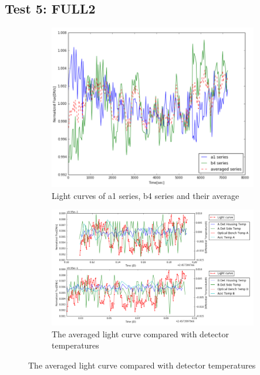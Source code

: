 \documentclass{aastex6}
\begin{document}
\subsection{Test 5: FULL2} 
\begin{figure}[H]
    \centering
    \begin{subfigure}{1}
        \includegraphics[scale=0.4]{ts_test5}
        \caption{Light curves of a1 series, b4 series and their average}
    \end{subfigure}

    \begin{subfigure}{2}
        \includegraphics[scale=0.4]{temp_test5}
        \caption{The averaged light curve compared with detector temperatures}
    \end{subfigure}
   

\end{figure}
\end{document}
